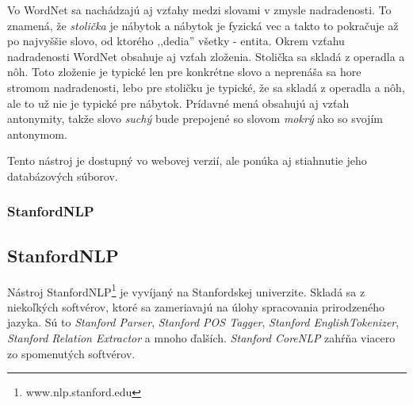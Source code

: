 Vo WordNet sa nachádzajú aj vzťahy medzi slovami v zmysle nadradenosti. To znamená, že \textit{stolička} je nábytok a nábytok je fyzická vec a takto to pokračuje až po najvyššie slovo, od ktorého ,,dedia'' všetky - entita. Okrem vzťahu nadradenosti WordNet obsahuje aj vzťah zloženia. Stolička sa skladá z operadla a nôh. Toto zloženie je typické len pre konkrétne slovo a neprenáša sa hore stromom nadradenosti,   lebo pre stoličku je typické, že sa skladá z operadla a nôh, ale to už nie je typické pre nábytok.
Prídavné mená obsahujú aj vzťah antonymity, takže slovo \textit{suchý} bude prepojené so slovom \textit{mokrý} ako so svojím antonymom.

Tento nástroj je dostupný vo webovej verzií, ale ponúka aj stiahnutie jeho databázových súborov.

%

%
%
{
	\subsubsection{StanfordNLP}
}
{
	\subsection{StanfordNLP}
}
\label{subsubsec:stanfordnlp}
Nástroj StanfordNLP\footnote{www.nlp.stanford.edu} je vyvíjaný na Stanfordskej univerzite. Skladá sa z niekoľkých softvérov, ktoré sa zameriavajú na úlohy spracovania prirodzeného jazyka. Sú to \textit{Stanford Parser}, \textit{Stanford POS Tagger}, \textit{Stanford EnglishTokenizer}, \textit{Stanford Relation Extractor} a mnoho ďalších. \textit{Stanford CoreNLP} zahŕňa viacero zo spomenutých softvérov.

